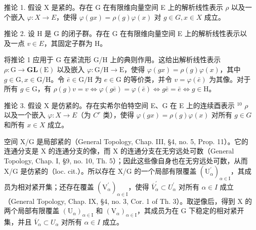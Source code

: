 推论 1. 假设 X 是紧的。存在 G 在有限维向量空间 E 上的解析线性表示 \(\rho\) 以及一个嵌入 \(\varphi: X \to E\)，使得 \(\varphi(gx) = \rho(g)\varphi(x)\) 对 \(g \in G, x \in X\) 成立。

推论 2. 设 H 是 G 的闭子群。存在 G 在有限维向量空间 E 上的解析线性表示以及一点 \(v \in E\)，其固定子群为 H。

将推论 1 应用于 G 在紧流形 G/H 上的典则作用。这给出解析线性表示 \(\rho: \mathrm{G} \to \mathbf{GL}(\mathrm{E})\) 以及嵌入 \(\varphi: \mathrm{G} / \mathrm{H} \to \mathrm{E}\)，使得 \(\varphi(gx) = \rho(g)\varphi(x)\)，其中 \(g \in \mathrm{G}, x \in \mathrm{G} / \mathrm{H}\)。令 \(\bar{e} \in \mathrm{G} / \mathrm{H}\) 为 \(e \in \mathrm{G}\) 的等价类，并令 \(v = \varphi(\bar{e})\) 为其像。对于所有 \(g \in \mathrm{G}\)，有 \(\rho(g)v = v \Longleftrightarrow \varphi(g\bar{e}) = \varphi(\bar{e}) \Longleftrightarrow g\bar{e} = \bar{e} \Longleftrightarrow g \in \mathrm{H}\)。

推论 3. 假设 X 是仿紧的。存在实希尔伯特空间 E、G 在 E 上的连续酉表示 \({}^{10}\) \(\rho\) 以及一个嵌入 \(\varphi: X \to E\)（为 \(C^{r}\) 类），使得 \(\varphi(gx) = \rho(g)\varphi(x)\) 对所有 \(g \in G\) 和所有 \(x \in X\) 成立。

空间 X/G 是局部紧的（General Topology, Chap. III, §4, no. 5, Prop. 11）。它的连通分支是 X 的连通分支的像，而 X 的连通分支在无穷远处可数（General Topology, Chap. I, §9, no. 10, Th. 5）；因此这些像自身也在无穷远处可数，从而 X/G 是仿紧的（loc. cit.）。所以存在 X/G 的一个局部有限覆盖 \((\mathrm{U}_{\alpha}^{\prime})_{\alpha\in\mathrm{I}}\)，其成员为相对紧开集；还存在覆盖 \((\mathrm{V}_{\alpha}^{\prime})_{\alpha\in\mathrm{I}}\)，使得 \(\overline{V}_{\alpha}^{\prime}\subset U_{\alpha}^{\prime}\) 对所有 \(\alpha\in I\) 成立（General Topology, Chap. IX, §4, no. 3, Cor. 1 of Th. 3）。取逆像后，得到 X 的两个局部有限覆盖 \((\mathrm{U}_{\alpha})_{\alpha\in\mathrm{I}}\) 和 \((\mathrm{V}_{\alpha})_{\alpha\in\mathrm{I}}\)，其成员为在 G 下稳定的相对紧开集，并且 \(\overline{V}_{\alpha}\subset U_{\alpha}\) 对所有 \(\alpha\in I\) 成立。

